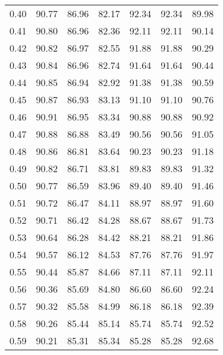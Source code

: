 \begin{tabular}{|c|c|c|c|c|c|c|}
      0.40 &     90.77 &     86.96 &      82.17 &   92.34 &      92.34 &         89.98 \\
      0.41 &     90.80 &     86.96 &      82.36 &   92.11 &      92.11 &         90.14 \\
      0.42 &     90.82 &     86.97 &      82.55 &   91.88 &      91.88 &         90.29 \\
      0.43 &     90.84 &     86.96 &      82.74 &   91.64 &      91.64 &         90.44 \\
      0.44 &     90.85 &     86.94 &      82.92 &   91.38 &      91.38 &         90.59 \\
      0.45 &     90.87 &     86.93 &      83.13 &   91.10 &      91.10 &         90.76 \\
      0.46 &     90.91 &     86.95 &      83.34 &   90.88 &      90.88 &         90.92 \\
      0.47 &     90.88 &     86.88 &      83.49 &   90.56 &      90.56 &         91.05 \\
      0.48 &     90.86 &     86.81 &      83.64 &   90.23 &      90.23 &         91.18 \\
      0.49 &     90.82 &     86.71 &      83.81 &   89.83 &      89.83 &         91.32 \\
      0.50 &     90.77 &     86.59 &      83.96 &   89.40 &      89.40 &         91.46 \\
      0.51 &     90.72 &     86.47 &      84.11 &   88.97 &      88.97 &         91.60 \\
      0.52 &     90.71 &     86.42 &      84.28 &   88.67 &      88.67 &         91.73 \\
      0.53 &     90.64 &     86.28 &      84.42 &   88.21 &      88.21 &         91.86 \\
      0.54 &     90.57 &     86.12 &      84.53 &   87.76 &      87.76 &         91.97 \\
      0.55 &     90.44 &     85.87 &      84.66 &   87.11 &      87.11 &         92.11 \\
      0.56 &     90.36 &     85.69 &      84.80 &   86.60 &      86.60 &         92.24 \\
      0.57 &     90.32 &     85.58 &      84.99 &   86.18 &      86.18 &         92.39 \\
      0.58 &     90.26 &     85.44 &      85.14 &   85.74 &      85.74 &         92.52 \\
      0.59 &     90.21 &     85.31 &      85.34 &   85.28 &      85.28 &         92.68 \\

\end{tabular}

